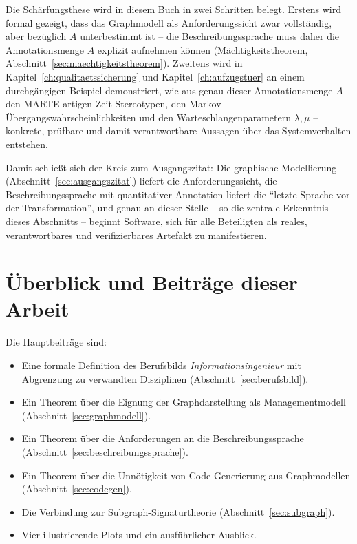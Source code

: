 ﻿\documentclass[a4paper,12pt]{report}
\theoremstyle{definition}
\begin{document}
\noindent
Die Schärfungsthese wird in diesem Buch in zwei Schritten belegt. Erstens wird
formal gezeigt, dass das Graphmodell als Anforderungssicht zwar vollständig, aber
bezüglich $A$ unterbestimmt ist -- die Beschreibungssprache muss daher die
Annotationsmenge $A$ explizit aufnehmen können (Mächtigkeitstheorem,
Abschnitt~\ref{sec:maechtigkeitstheorem}). Zweitens wird in
Kapitel~\ref{ch:qualitaetssicherung} und Kapitel~\ref{ch:aufzugstuer} an einem
durchgängigen Beispiel demonstriert, wie aus genau dieser Annotationsmenge $A$ -- den
MARTE-artigen Zeit-Stereotypen, den Markov-Übergangswahrscheinlichkeiten und den
Warteschlangenparametern $\lambda, \mu$ -- konkrete, prüfbare und damit
verantwortbare Aussagen über das Systemverhalten entstehen.

\noindent
Damit schließt sich der Kreis zum Ausgangszitat: Die graphische Modellierung
(Abschnitt~\ref{sec:ausgangszitat}) liefert die Anforderungssicht, die
Beschreibungssprache mit quantitativer Annotation liefert die ``letzte Sprache vor
der Transformation'', und genau an dieser Stelle -- so die zentrale Erkenntnis dieses
Abschnitts -- beginnt Software, sich für alle Beteiligten als reales,
verantwortbares und verifizierbares Artefakt zu manifestieren.

\section{Überblick und Beiträge dieser Arbeit}

Die Hauptbeiträge sind:

\begin{itemize}
  \item Eine formale Definition des Berufsbilds \emph{Informationsingenieur} mit
        Abgrenzung zu verwandten Disziplinen (Abschnitt~\ref{sec:berufsbild}).
  \item Ein Theorem über die Eignung der Graphdarstellung als Managementmodell
        (Abschnitt~\ref{sec:graphmodell}).
  \item Ein Theorem über die Anforderungen an die Beschreibungssprache
        (Abschnitt~\ref{sec:beschreibungssprache}).
  \item Ein Theorem über die Unnötigkeit von Code-Generierung aus Graphmodellen
        (Abschnitt~\ref{sec:codegen}).
  \item Die Verbindung zur Subgraph-Signaturtheorie
        (Abschnitt~\ref{sec:subgraph}).
  \item Vier illustrierende Plots und ein ausführlicher Ausblick.
\end{itemize}
\end{document}
